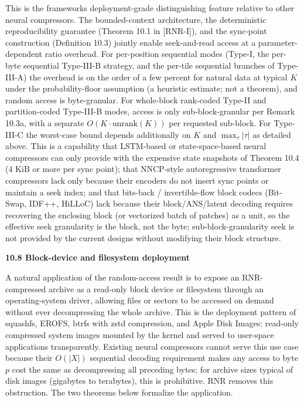 \documentclass[
]{article}
\begin{document}
This is the framework\textquotesingle s deployment-grade distinguishing
feature relative to other neural compressors. The bounded-context
architecture, the deterministic reproducibility guarantee (Theorem
10.1 in [RNR-I]), and the sync-point construction (Definition 10.3) jointly
enable seek-and-read access at a parameter-dependent ratio
overhead. For per-position sequential modes (Type-I, the per-byte
sequential Type-III-B strategy, and the per-tile sequential
branches of Type-III-A) the overhead is on the order of a few
percent for natural data at typical $K$ under the
probability-floor assumption (a heuristic estimate; not a theorem),
and random access is byte-granular. For whole-block rank-coded
Type-II and partition-coded Type-III-B modes, access is only
sub-block-granular per Remark 10.3a, with a separate $O(K \cdot
\mathrm{unrank}(K))$ per requested sub-block. For Type-III-C the
worst-case bound depends additionally on $K$ and $\max_\tau
|\tau|$ as detailed above. This is a capability that
LSTM-based or state-space-based
neural compressors can only provide with the expensive state
snapshots of Theorem 10.4 (4 KiB or more per sync point); that
NNCP-style autoregressive transformer compressors lack only because
their encoders do not insert sync points or maintain a seek index;
and that bits-back / invertible-flow block codecs (Bit-Swap, IDF++,
HiLLoC) lack because their block/ANS/latent decoding requires
recovering the enclosing block (or vectorized batch of patches) as
a unit, so the effective seek granularity is the block, not the
byte; sub-block-granularity seek is not provided by the current
designs without modifying their block structure.

\textbf{10.8 Block-device and filesystem deployment}

A natural application of the random-access result is to expose an
RNR-compressed archive as a read-only block device or filesystem through
an operating-system driver, allowing files or sectors to be accessed on
demand without ever decompressing the whole archive. This is the
deployment pattern of squashfs, EROFS, btrfs with zstd compression, and
Apple Disk Images: read-only compressed system images mounted by the
kernel and served to user-space applications transparently. Existing
neural compressors cannot serve this use case because their
$O(|X|)$ sequential decoding requirement makes any access to byte
$p$ cost the same as decompressing all preceding bytes; for archive
sizes typical of disk images (gigabytes to terabytes), this is
prohibitive. RNR removes this obstruction. The two theorems below
formalize the application.
\end{document}
